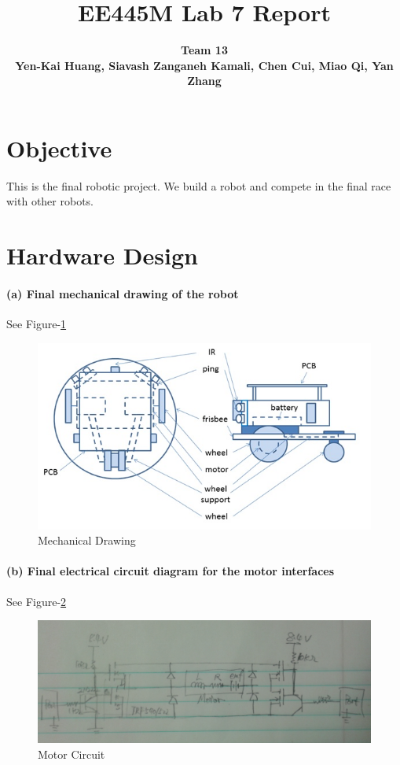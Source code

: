 \documentclass[a4paper]{article}
\newlength{\pic}
\begin{document}
\title{EE445M Lab 7 Report}
\author{\bfseries Team 13 \\ Yen-Kai Huang, Siavash Zanganeh Kamali, Chen Cui, Miao Qi, Yan Zhang}
\maketitle

\section{Objective} This is the final robotic project. We build a robot and compete in the final race with other robots.

\section{Hardware Design}

\paragraph{(a) Final mechanical drawing of the robot }
See Figure-\ref{mech}

\setlength{\pic}{\textwidth}
\begin{figure}[htp]
\center
\includegraphics[width=\pic]{circuits/mechanical_drawing}
\caption{Mechanical Drawing} \label{mech}
\end{figure}

\paragraph{(b) Final electrical circuit diagram for the motor interfaces }
See Figure-\ref{pwm}

\setlength{\pic}{12cm}
\begin{figure}[htp]
\center
\includegraphics[width=\pic]{circuits/Alternate_H-bridge}
\caption{Motor Circuit} \label{pwm}
\end{figure}
\end{document}

